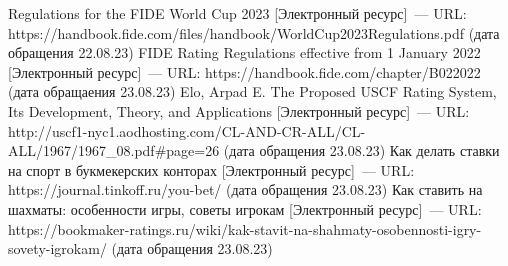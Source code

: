 \begin{thebibliography}{}
	 Regulations for the FIDE World Cup 2023 [Электронный ресурс]~--- URL: https://handbook.fide.com/files/handbook/WorldCup2023Regulations.pdf (дата обращения 22.08.23)
	 FIDE Rating Regulations effective from 1 January 2022 [Электронный ресурс]~--- URL: https://handbook.fide.com/chapter/B022022 (дата обращаения 23.08.23)
	 Elo, Arpad E. The Proposed USCF Rating System, Its Development, Theory, and Applications [Электронный ресурс]~--- URL: http://uscf1-nyc1.aodhosting.com/CL-AND-CR-ALL/CL-ALL/1967/1967\_08.pdf\#page=26 (дата обращения 23.08.23)
	 Как делать ставки на спорт в букмекерских конторах [Электронный ресурс]~--- URL: https://journal.tinkoff.ru/you-bet/ (дата обращения 23.08.23)
	 Как ставить на шахматы: особенности игры, советы игрокам [Электронный ресурс]~--- URL: https://bookmaker-ratings.ru/wiki/kak-stavit-na-shahmaty-osobennosti-igry-sovety-igrokam/ (дата обращения 23.08.23)
\end{thebibliography}
